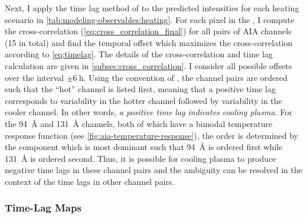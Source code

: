 Next, I apply the time lag method of \citet{viall_evidence_2012} to the predicted intensities for each heating scenario in \autoref{tab:modeling-observables:heating}. For each pixel in the \AR{}, I compute the cross-correlation (\autoref{eq:cross_correlation_final}) for all pairs of AIA channels (15 in total) and find the temporal offset which maximizes the cross-correlation according to \autoref{eq:timelag}. The details of the cross-correlation and time lag calculation are given in \autoref{subsec:cross_correlation}. I consider all possible offsets over the interval $\pm\SI{6}{\hour}$. Using the convention of \citet{viall_evidence_2012}, the channel pairs are ordered such that the ``hot'' channel is listed first, meaning that a positive time lag corresponds to variability in the hotter channel followed by variability in the cooler channel. In other words, \textit{a positive time lag indicates cooling plasma.} For the \SI{94}{\angstrom} and \SI{131}{\angstrom} channels, both of which have a bimodal temperature response function (see \autoref{fig:aia-temperature-response}), the order is determined by the component which is most dominant such that \SI{94}{\angstrom} is ordered first while \SI{131}{\angstrom} is ordered second. Thus, it is possible for cooling plasma to produce negative time lags in these channel pairs and the ambiguity can be resolved in the context of the time lags in other channel pairs.

\subsubsection{Time-Lag Maps}\label{sec:modeling-observables:timelag_maps}

